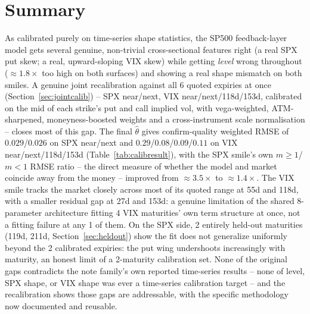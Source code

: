 \documentclass[11pt]{article}
\begin{document}
\FloatBarrier
\section{Summary}
\label{sec:summary}
As calibrated purely on time-series shape statistics, the SP500
feedback-layer model gets several genuine, non-trivial cross-sectional
features right (a real SPX put skew; a real, upward-sloping VIX skew)
while getting \emph{level} wrong throughout ($\approx1.8\times$ too
high on both surfaces) and showing a real shape mismatch on both
smiles. A genuine joint recalibration against all 6 quoted expiries
at once (Section~\ref{sec:jointcalib}) -- SPX near/next, VIX
near/next/118d/153d, calibrated on the mid of each strike's put and
call implied vol, with vega-weighted, ATM-sharpened, moneyness-boosted
weights and a cross-instrument scale normalisation -- closes most of
this gap. The final $\hat\theta$ gives confirm-quality weighted RMSE
of $0.029$/$0.026$ on SPX near/next and $0.29$/$0.08$/$0.09$/$0.11$ on
VIX near/next/118d/153d (Table~\ref{tab:calibresult}), with the SPX
smile's own $m\ge1$/$m<1$ RMSE ratio -- the direct measure of whether
the model and market coincide away from the money -- improved from
$\approx3.5\times$ to $\approx1.4\times$. The VIX smile tracks the
market closely across most of its quoted range at 55d and 118d, with
a smaller residual gap at 27d and 153d: a genuine limitation of the
shared 8-parameter architecture fitting 4 VIX maturities' own term
structure at once, not a fitting failure at any 1 of them. On the SPX
side, 2 entirely held-out maturities (119d, 211d, Section~\ref{sec:heldout})
show the fit does not generalize uniformly beyond the 2 calibrated
expiries: the put wing undershoots increasingly with maturity, an
honest limit of a 2-maturity calibration set. None of the original
gaps contradicts the note family's own reported time-series results
-- none of level, SPX shape, or VIX shape was ever a time-series
calibration target -- and the recalibration shows those gaps are
addressable, with the specific methodology now documented and
reusable.
\end{document}
